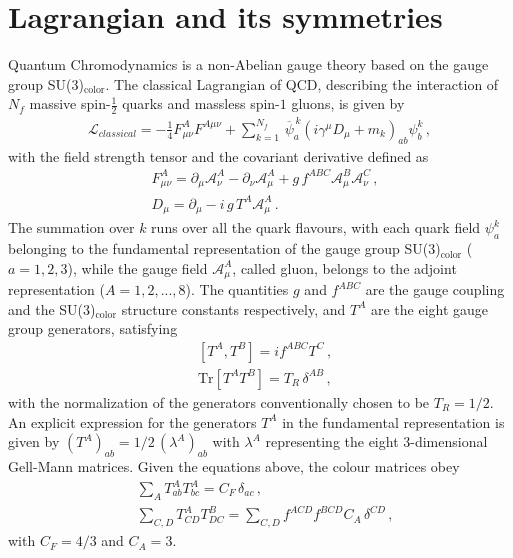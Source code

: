 \section{Lagrangian and its symmetries}
%
Quantum Chromodynamics is a non-Abelian gauge theory based on the gauge group SU(3)$_\text{color}$.
The classical Lagrangian of QCD, describing the interaction of $N_f$ massive spin-$\frac{1}{2}$ quarks
and massless spin-$1$ gluons, is given by
\begin{align}
    \label{eq:QCD_lagrangian}
    \mathcal{L}_{classical} = -\frac{1}{4}F^{A}_{\mu\nu}F^{A\mu\nu} + 
    \sum_{k=1}^{N_f}\,{\overline{\psi}}^{\,k}_a\left(i\gamma^{\mu}D_{\mu} + m_k\right)_{ab}\psi^k_b\,,
\end{align}
with the field strength tensor and the covariant derivative defined as
\begin{align}
    \label{eq:field_strength_thensor}
    &F^{A}_{\mu\nu} = \partial_{\mu} \mathcal{A}^A_{\nu} - \partial_{\nu} \mathcal{A}^A_{\mu} 
    + g \, f^{ABC} \mathcal{A}^B_{\mu}\mathcal{A}^C_{\nu}\,, \\
    \label{eq:covariant_derivateive}
    &D_{\mu} = \partial_{\mu} - i\,g\,T^A \mathcal{A}^{A}_{\mu}\,.
\end{align}
The summation over $k$ runs over all the quark flavours, with
each quark field $\psi^k_a$ belonging to the fundamental representation of the gauge group SU(3)$_\text{color}$ ($a=1,2,3$),
while the gauge field $\mathcal{A}^A_{\mu}$, called gluon, belongs to the adjoint representation
($A=1,2,...,8$). The quantities $g$ and $f^{ABC}$ are the gauge coupling and the SU(3)$_\text{color}$ structure constants
respectively, and $T^A$ are the eight gauge group generators, satisfying
\begin{align}
    \label{eq:algebra}
    &\left[T^A,T^B\right] = i f^{ABC} T^C\,, \\
    \label{eq:normalization_SU3_generators}
    &\text{Tr}\left[T^A T^B\right] = T_R\, \delta^{AB}\,,
\end{align}
with the normalization of the generators conventionally chosen to be $T_R = 1/2$. 
An explicit expression for the generators $T^A$ in the fundamental representation is given by
$(T^A)_{ab} = 1/2\,\left(\lambda^A\right)_{ab}$ with $\lambda^A$ representing the eight 3-dimensional Gell-Mann matrices. 
Given the equations above, the colour matrices obey
\begin{align}
    \label{eq:SU3_generators_relations}
    &\sum_A T^A_{ab} T^A_{bc} = C_F\, \delta_{ac}\,,\\
    &\sum_{C,D} T^A_{CD} T^B_{DC} = \sum_{C,D} f^{ACD} f^{BCD}  C_A\, \delta^{CD}\,,
\end{align}
with $C_F= 4/3$ and $C_A= 3$.

